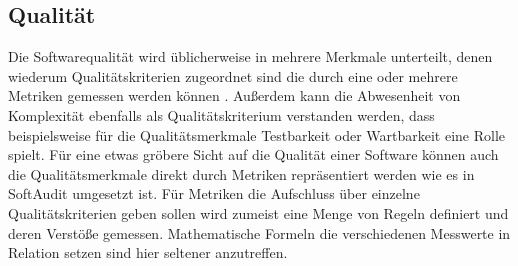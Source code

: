 \documentclass[gb,ngerman]{stthesis}
\begin{document}
     	\subsection{Qualität}
     		Die Softwarequalität wird üblicherweise in mehrere Merkmale unterteilt, denen wiederum Qualitätskriterien zugeordnet sind die durch eine oder mehrere Metriken gemessen werden können \cite{SoftwareMetrics}. Außerdem kann die Abwesenheit von Komplexität ebenfalls als Qualitätskriterium verstanden werden, dass beispielsweise für die Qualitätsmerkmale Testbarkeit oder Wartbarkeit eine Rolle spielt. Für eine etwas gröbere Sicht auf die Qualität einer Software können auch die Qualitätsmerkmale direkt durch Metriken repräsentiert werden wie es in SoftAudit umgesetzt ist. \newline
     		Für Metriken die Aufschluss über einzelne Qualitätskriterien geben sollen wird zumeist eine Menge von Regeln definiert und deren Verstöße gemessen. Mathematische Formeln die verschiedenen Messwerte in Relation setzen sind hier seltener anzutreffen.
\end{document}

